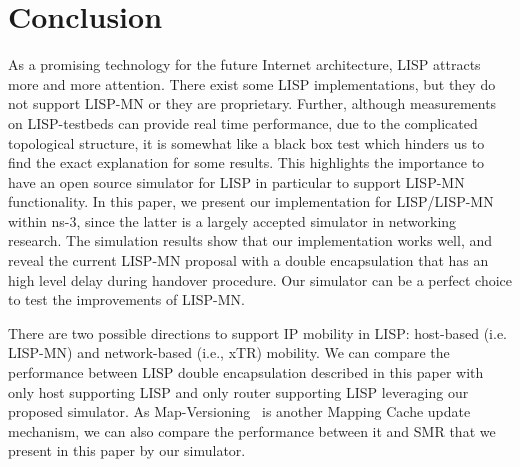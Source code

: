 \section{Conclusion}
\label{sec:ns3_conclusion}
As a promising technology for the future Internet architecture, LISP attracts more and more attention. There exist some LISP implementations, but they do not support LISP-MN or they are proprietary. Further, although measurements on LISP-testbeds can provide real time performance, due to the complicated topological structure, it is somewhat like a black box test which hinders us to find the exact explanation for some results. This highlights the importance to have an open source simulator for LISP in particular to support LISP-MN functionality. In this paper, we present our implementation for LISP/LISP-MN within ns-3, since the latter is a largely accepted simulator in networking research. The simulation results show that our implementation works well, and reveal the current LISP-MN proposal with a double encapsulation that has an high level delay during handover procedure. Our simulator can be a perfect choice to test the improvements of LISP-MN.

There are two possible directions to support IP mobility in LISP: host-based (i.e. LISP-MN) and network-based (i.e., xTR) mobility. We can compare the performance between LISP double encapsulation described in this paper with only host supporting LISP and only router supporting LISP leveraging our proposed simulator. As Map-Versioning~\cite{rfc6834} is another Mapping Cache update mechanism, we can also compare the performance between it and SMR that we present in this paper by our simulator.
